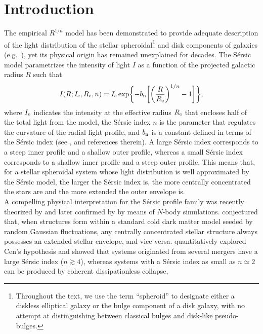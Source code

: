 \documentclass[preprint2]{emulateapj}
\begin{document}
\section{Introduction}
The empirical \cite{sersic1963,sersic1968} $R^{1/n}$ model has been demonstrated to provide adequate description 
of the light distribution of the stellar spheroidal\footnote{Throughout the text, we use the term ``spheroid'' to designate 
either a diskless elliptical galaxy or the bulge component of a disk galaxy, 
with no attempt at distinguishing between classical bulges and disk-like pseudo-bulges. } and disk components of galaxies 
(e.g.~\citealt{caon1993,andredakis1995,iodice1997,iodice1999,seigar1998,khosroshahi2000}), 
yet its physical origin has remained unexplained for decades. 
The S\'ersic model parametrizes the intensity of light $I$ as a function of the projected galactic radius $R$ such that
\begin{equation*}
I(R; I_{\rm e},R_{\rm e},n) = I_{\rm e} \exp \biggl \{ -b_{\rm n} \biggl [ \biggl (\frac{R}{R_{\rm e}} \biggr )^{1/n} -1 \biggr ] \biggr \}, 
\end{equation*}
where $I_{\rm e}$ indicates the intensity at the effective radius $R_{\rm e}$ that encloses half of the total light from the model, 
the S\'ersic index $n$ is the parameter that regulates the curvature of the radial light profile, 
and $b_{\rm n}$ is a constant defined in terms of the S\'ersic index (see \citealt{grahamdriver2005}, and references therein). 
A large S\'ersic index corresponds to a steep inner profile and a shallow outer profile, 
whereas a small S\'ersic index corresponds to a shallow inner profile and a steep outer profile. 
This means that, for a stellar spheroidal system whose light distribution is well approximated by the S\'ersic model, 
the larger the S\'ersic index is, the more centrally concentrated the stars are and the more extended the outer envelope is. \\
A compelling physical interpretation for the S\'ersic profile family was recently theorized by \cite{cen2014} 
and later confirmed by \cite{nipoti2015} by means of $N$-body simulations. 
\cite{cen2014} conjectured that, when structures form within a standard cold dark matter model seeded by random Gaussian fluctuations, 
any centrally concentrated stellar structure always possesses an extended stellar envelope, and vice versa. 
\cite{nipoti2015} quantitatively explored Cen's hypothesis and showed that 
systems originated from several mergers have a large S\'ersic index ($n \gtrsim 4$), 
whereas systems with a S\'ersic index as small as $n \simeq 2$ can be produced by coherent dissipationless collapse, 
\end{document}
